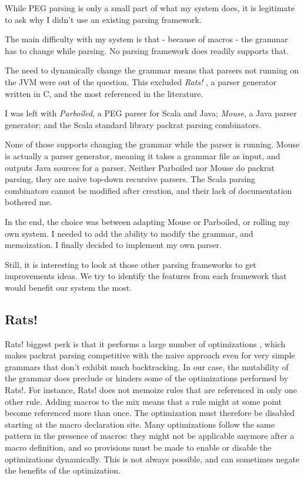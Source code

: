 While PEG parsing is only a small part of what my system does, it is legitimate
to ask why I didn't use an existing parsing framework.

The main difficulty with my system is that - because of macros - the grammar has
to change while parsing. No parsing framework does readily supports that.

The need to dynamically change the grammar means that parsers not running on the
JVM were out of the question. This excluded \emph{Rats!} \cite{grimm2006}, a
parser generator written in C, and the most referenced in the literature.

I was left with \emph{Parboiled}, a PEG parser for Scala and Java; \emph{Mouse},
a Java parser generator; and the Scala standard library packrat parsing
combinators.

None of those supports changing the grammar while the parser is running. Mouse
is actually a parser generator, meaning it takes a grammar file as input, and
outputs Java sources for a parser. Neither Parboiled nor Mouse do packrat
parsing, they are naive top-down recursive parsers. The Scala parsing
combinators cannot be modified after creation, and their lack of documentation
bothered me.

In the end, the choice was between adapting Mouse or Parboiled, or rolling my
own system. I needed to add the ability to modify the grammar, and
memoization. I finally decided to implement my own parser.

Still, it is interesting to look at those other parsing frameworks to get
improvements ideas. We try to identify the features from each framework that
would benefit our system the most.

\subsection{Rats!}

Rats! biggest perk is that it performs a large number of optimizations
\cite{grimm2006}, which makes packrat parsing competitive with the naive
approach even for very simple grammars that don't exhibit much backtracking. In
our case, the mutability of the grammar does preclude or hinders some of the
optimizations performed by Rats!. For instance, Rats! does not memoize rules
that are referenced in only one other rule. Adding macros to the mix means that
a rule might at some point become referenced more than once. The optimization
must therefore be disabled starting at the macro declaration site. Many
optimizations follow the same pattern in the presence of macros: they might not
be applicable anymore after a macro definition, and so provisions must be made
to enable or disable the optimizations dynamically. This is not always possible,
and can sometimes negate the benefits of the optimization.

